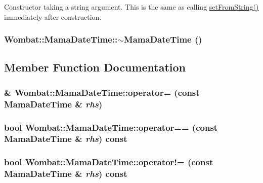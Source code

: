 Constructor taking a string argument. This is the same as calling \hyperlink{classWombat_1_1MamaDateTime_a403d86b47924626e1674ebdd9e8d9bb2}{setFromString()} immediately after construction. \hypertarget{classWombat_1_1MamaDateTime_a8cac3d8a2bda4a2448f1ddd77325da59}{
\subsubsection[{$\sim$MamaDateTime}]{\setlength{\rightskip}{0pt plus 5cm}Wombat::MamaDateTime::$\sim$MamaDateTime ()}}
\label{classWombat_1_1MamaDateTime_a8cac3d8a2bda4a2448f1ddd77325da59}


\subsection{Member Function Documentation}
\hypertarget{classWombat_1_1MamaDateTime_ac7cd923eb7faa640d4302c77ca52358c}{
\subsubsection[{operator=}]{\& Wombat::MamaDateTime::operator= (const {\bf MamaDateTime} \& {\em rhs})}}
\label{classWombat_1_1MamaDateTime_ac7cd923eb7faa640d4302c77ca52358c}
\hypertarget{classWombat_1_1MamaDateTime_a62e1f438c1ad0a899bdacb39d20c86cf}{
\subsubsection[{operator==}]{\setlength{\rightskip}{0pt plus 5cm}bool Wombat::MamaDateTime::operator== (const {\bf MamaDateTime} \& {\em rhs}) const}}
\label{classWombat_1_1MamaDateTime_a62e1f438c1ad0a899bdacb39d20c86cf}
\hypertarget{classWombat_1_1MamaDateTime_a7f8ea791ba3ad83e644700a8ffe8451e}{
\subsubsection[{operator!=}]{\setlength{\rightskip}{0pt plus 5cm}bool Wombat::MamaDateTime::operator!= (const {\bf MamaDateTime} \& {\em rhs}) const}}
